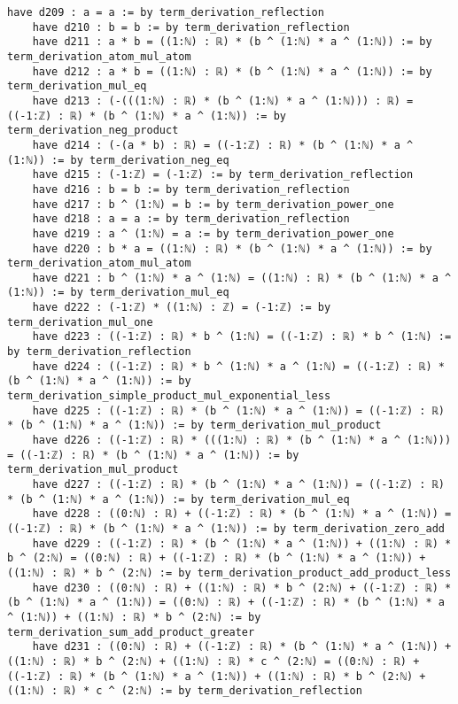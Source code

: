 \documentclass{article}
\begin{document}
\begin{tcolorbox}[colback=white!10, width=\linewidth]
\begin{lstlisting}[language=Lean4]
    have d209 : a = a := by term_derivation_reflection
    have d210 : b = b := by term_derivation_reflection
    have d211 : a * b = ((1:ℕ) : ℝ) * (b ^ (1:ℕ) * a ^ (1:ℕ)) := by term_derivation_atom_mul_atom
    have d212 : a * b = ((1:ℕ) : ℝ) * (b ^ (1:ℕ) * a ^ (1:ℕ)) := by term_derivation_mul_eq
    have d213 : (-(((1:ℕ) : ℝ) * (b ^ (1:ℕ) * a ^ (1:ℕ))) : ℝ) = ((-1:ℤ) : ℝ) * (b ^ (1:ℕ) * a ^ (1:ℕ)) := by term_derivation_neg_product
    have d214 : (-(a * b) : ℝ) = ((-1:ℤ) : ℝ) * (b ^ (1:ℕ) * a ^ (1:ℕ)) := by term_derivation_neg_eq
    have d215 : (-1:ℤ) = (-1:ℤ) := by term_derivation_reflection
    have d216 : b = b := by term_derivation_reflection
    have d217 : b ^ (1:ℕ) = b := by term_derivation_power_one
    have d218 : a = a := by term_derivation_reflection
    have d219 : a ^ (1:ℕ) = a := by term_derivation_power_one
    have d220 : b * a = ((1:ℕ) : ℝ) * (b ^ (1:ℕ) * a ^ (1:ℕ)) := by term_derivation_atom_mul_atom
    have d221 : b ^ (1:ℕ) * a ^ (1:ℕ) = ((1:ℕ) : ℝ) * (b ^ (1:ℕ) * a ^ (1:ℕ)) := by term_derivation_mul_eq
    have d222 : (-1:ℤ) * ((1:ℕ) : ℤ) = (-1:ℤ) := by term_derivation_mul_one
    have d223 : ((-1:ℤ) : ℝ) * b ^ (1:ℕ) = ((-1:ℤ) : ℝ) * b ^ (1:ℕ) := by term_derivation_reflection
    have d224 : ((-1:ℤ) : ℝ) * b ^ (1:ℕ) * a ^ (1:ℕ) = ((-1:ℤ) : ℝ) * (b ^ (1:ℕ) * a ^ (1:ℕ)) := by term_derivation_simple_product_mul_exponential_less
    have d225 : ((-1:ℤ) : ℝ) * (b ^ (1:ℕ) * a ^ (1:ℕ)) = ((-1:ℤ) : ℝ) * (b ^ (1:ℕ) * a ^ (1:ℕ)) := by term_derivation_mul_product
    have d226 : ((-1:ℤ) : ℝ) * (((1:ℕ) : ℝ) * (b ^ (1:ℕ) * a ^ (1:ℕ))) = ((-1:ℤ) : ℝ) * (b ^ (1:ℕ) * a ^ (1:ℕ)) := by term_derivation_mul_product
    have d227 : ((-1:ℤ) : ℝ) * (b ^ (1:ℕ) * a ^ (1:ℕ)) = ((-1:ℤ) : ℝ) * (b ^ (1:ℕ) * a ^ (1:ℕ)) := by term_derivation_mul_eq
    have d228 : ((0:ℕ) : ℝ) + ((-1:ℤ) : ℝ) * (b ^ (1:ℕ) * a ^ (1:ℕ)) = ((-1:ℤ) : ℝ) * (b ^ (1:ℕ) * a ^ (1:ℕ)) := by term_derivation_zero_add
    have d229 : ((-1:ℤ) : ℝ) * (b ^ (1:ℕ) * a ^ (1:ℕ)) + ((1:ℕ) : ℝ) * b ^ (2:ℕ) = ((0:ℕ) : ℝ) + ((-1:ℤ) : ℝ) * (b ^ (1:ℕ) * a ^ (1:ℕ)) + ((1:ℕ) : ℝ) * b ^ (2:ℕ) := by term_derivation_product_add_product_less
    have d230 : ((0:ℕ) : ℝ) + ((1:ℕ) : ℝ) * b ^ (2:ℕ) + ((-1:ℤ) : ℝ) * (b ^ (1:ℕ) * a ^ (1:ℕ)) = ((0:ℕ) : ℝ) + ((-1:ℤ) : ℝ) * (b ^ (1:ℕ) * a ^ (1:ℕ)) + ((1:ℕ) : ℝ) * b ^ (2:ℕ) := by term_derivation_sum_add_product_greater
    have d231 : ((0:ℕ) : ℝ) + ((-1:ℤ) : ℝ) * (b ^ (1:ℕ) * a ^ (1:ℕ)) + ((1:ℕ) : ℝ) * b ^ (2:ℕ) + ((1:ℕ) : ℝ) * c ^ (2:ℕ) = ((0:ℕ) : ℝ) + ((-1:ℤ) : ℝ) * (b ^ (1:ℕ) * a ^ (1:ℕ)) + ((1:ℕ) : ℝ) * b ^ (2:ℕ) + ((1:ℕ) : ℝ) * c ^ (2:ℕ) := by term_derivation_reflection

\end{lstlisting}
\end{tcolorbox}
\end{document}
